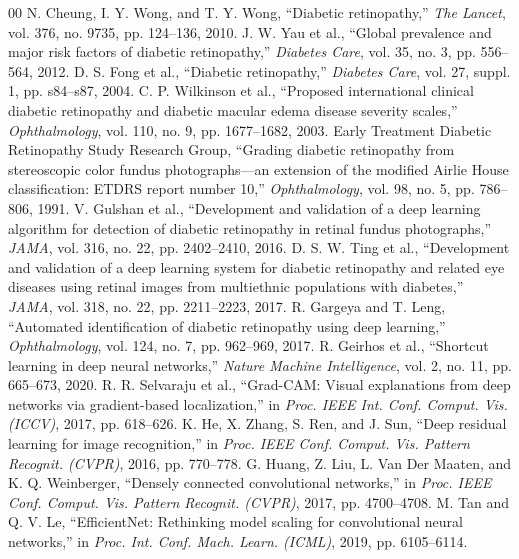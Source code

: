 \documentclass[conference]{IEEEtran}
\begin{document}
\begin{thebibliography}{00}
 N. Cheung, I. Y. Wong, and T. Y. Wong, ``Diabetic retinopathy,'' \textit{The Lancet}, vol. 376, no. 9735, pp. 124--136, 2010.
 J. W. Yau et al., ``Global prevalence and major risk factors of diabetic retinopathy,'' \textit{Diabetes Care}, vol. 35, no. 3, pp. 556--564, 2012.
 D. S. Fong et al., ``Diabetic retinopathy,'' \textit{Diabetes Care}, vol. 27, suppl. 1, pp. s84--s87, 2004.
 C. P. Wilkinson et al., ``Proposed international clinical diabetic retinopathy and diabetic macular edema disease severity scales,'' \textit{Ophthalmology}, vol. 110, no. 9, pp. 1677--1682, 2003.
 Early Treatment Diabetic Retinopathy Study Research Group, ``Grading diabetic retinopathy from stereoscopic color fundus photographs---an extension of the modified Airlie House classification: ETDRS report number 10,'' \textit{Ophthalmology}, vol. 98, no. 5, pp. 786--806, 1991.
 V. Gulshan et al., ``Development and validation of a deep learning algorithm for detection of diabetic retinopathy in retinal fundus photographs,'' \textit{JAMA}, vol. 316, no. 22, pp. 2402--2410, 2016.
 D. S. W. Ting et al., ``Development and validation of a deep learning system for diabetic retinopathy and related eye diseases using retinal images from multiethnic populations with diabetes,'' \textit{JAMA}, vol. 318, no. 22, pp. 2211--2223, 2017.
 R. Gargeya and T. Leng, ``Automated identification of diabetic retinopathy using deep learning,'' \textit{Ophthalmology}, vol. 124, no. 7, pp. 962--969, 2017.
 R. Geirhos et al., ``Shortcut learning in deep neural networks,'' \textit{Nature Machine Intelligence}, vol. 2, no. 11, pp. 665--673, 2020.
 R. R. Selvaraju et al., ``Grad-CAM: Visual explanations from deep networks via gradient-based localization,'' in \textit{Proc. IEEE Int. Conf. Comput. Vis. (ICCV)}, 2017, pp. 618--626.
 K. He, X. Zhang, S. Ren, and J. Sun, ``Deep residual learning for image recognition,'' in \textit{Proc. IEEE Conf. Comput. Vis. Pattern Recognit. (CVPR)}, 2016, pp. 770--778.
 G. Huang, Z. Liu, L. Van Der Maaten, and K. Q. Weinberger, ``Densely connected convolutional networks,'' in \textit{Proc. IEEE Conf. Comput. Vis. Pattern Recognit. (CVPR)}, 2017, pp. 4700--4708.
 M. Tan and Q. V. Le, ``EfficientNet: Rethinking model scaling for convolutional neural networks,'' in \textit{Proc. Int. Conf. Mach. Learn. (ICML)}, 2019, pp. 6105--6114.

\end{thebibliography}
\end{document}
